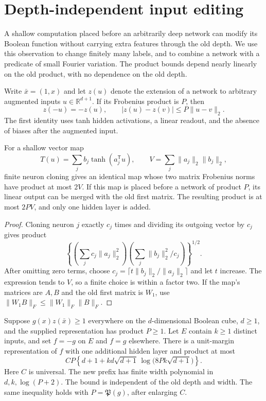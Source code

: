 \section{Depth-independent input editing}
\label{sec:primary-input-editing}

A shallow computation placed before an arbitrarily deep network can
modify its Boolean function without carrying extra features through
the old depth. We use this observation to change finitely many labels,
and to combine a network with a predicate of small Fourier variation.
The product bounds depend nearly linearly on the old product, with
no dependence on the old depth.

Write $\bar x=(1,x)$ and let $z(u)$ denote the extension of a network
to arbitrary augmented inputs $u\in\mathbb R^{d+1}$. If its Frobenius
product is $P$, then
\[
 z(-u)=-z(u),\qquad |z(u)-z(v)|\le P\|u-v\|_2.
\]
The first identity uses tanh hidden activations, a linear readout, and
the absence of biases after the augmented input.

\begin{lemma}
\label{lem:primary-vector-cloning}
For a shallow vector map
\[
 T(u)=\sum_j b_j\tanh(a_j^{\mathsf T}u),
 \qquad V=\sum_j\|a_j\|_2\|b_j\|_2,
\]
finite neuron cloning gives an identical map whose two matrix
Frobenius norms have product at most $2V$. If this map is placed
before a network of product $P$, its linear output can be merged
with the old first matrix. The resulting product is at most $2PV$,
and only one hidden layer is added.
\end{lemma}

\begin{proof}
Cloning neuron $j$ exactly $c_j$ times and dividing its outgoing
vector by $c_j$ gives product
\[
 \left\{\left(\sum_jc_j\|a_j\|_2^2\right)
              \left(\sum_j\|b_j\|_2^2/c_j\right)\right\}^{1/2}.
\]
After omitting zero terms, choose
$c_j=\lceil t\|b_j\|_2/\|a_j\|_2\rceil$ and let $t$ increase.
The expression tends to $V$, so a finite choice is within a factor
two. If the map's matrices are $A,B$ and the old first matrix is
$W_1$, use $\|W_1B\|_F\le\|W_1\|_F\|B\|_F$.
\end{proof}

\begin{theorem}
\label{thm:primary-finite-label-editing}
Suppose $g(x)z(\bar x)\ge1$ everywhere on the $d$-dimensional
Boolean cube, $d\ge1$, and the supplied representation has product
$P\ge1$. Let $E$ contain $k\ge1$ distinct inputs, and set
$f=-g$ on $E$ and $f=g$ elsewhere. There is a unit-margin
representation of $f$ with one additional hidden layer and product
at most
\[
 CP\left\{d+1+kd\sqrt{d+1}\,
                   \log\bigl(8Pk\sqrt{d+1}\bigr)\right\}.
\]
Here $C$ is universal. The new prefix has finite width polynomial
in $d,k,\log(P+2)$. The bound is independent of the old depth and
width. The same inequality holds with $P=\mathfrak P(g)$, after
enlarging $C$.
\end{theorem}

